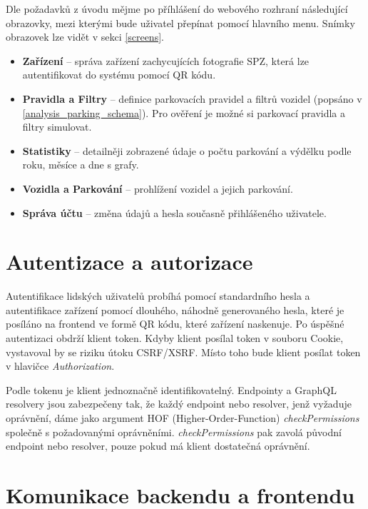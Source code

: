\noindent
Dle požadavků z úvodu mějme po příhlášení do webového rozhraní následující obrazovky,
mezi kterými bude uživatel přepínat pomocí hlavního menu.
Snímky obrazovek lze vidět v sekci \ref{screens}.

\begin{itemize}
  \setlength\itemsep{.05em}
  \item \textbf{Zařízení} -- správa zařízení zachycujících fotografie SPZ, která lze autentifikovat do systému pomocí
        QR kódu.
  \item \textbf{Pravidla a Filtry} -- definice parkovacích pravidel a filtrů vozidel (popsáno v \ref{analysis_parking_schema}).
        Pro ověření je možné si parkovací pravidla a filtry simulovat.
  \item \textbf{Statistiky} -- detailněji zobrazené údaje o počtu parkování a výdělku podle roku, měsíce a dne s grafy.
  \item \textbf{Vozidla a Parkování} -- prohlížení vozidel a jejich parkování.
  \item \textbf{Správa účtu} -- změna údajů a hesla současně přihlášeného uživatele.
\end{itemize}

\section{Autentizace a autorizace} \label{auther_authen}

\noindent
Autentifikace lidských uživatelů probíhá pomocí standardního hesla a autentifikace zařízení pomocí dlouhého,
náhodně generovaného hesla,
které je posíláno na frontend ve formě QR kódu, které zařízení naskenuje.
Po úspěšné autentizaci obdrží klient token.
Kdyby klient posílal token v souboru Cookie, vystavoval by se riziku útoku CSRF/XSRF.
Místo toho bude klient posílat token v hlavičce \textit{Authorization}.

Podle tokenu je klient jednoznačně identifikovatelný. Endpointy a GraphQL resolvery jsou zabezpečeny tak,
že každý endpoint nebo resolver, jenž vyžaduje oprávnění, dáme jako argument HOF (Higher-Order-Function)
\textit{checkPermissions} společně s požadovanými oprávněními. \textit{checkPermissions} pak zavolá původní
endpoint nebo resolver, pouze pokud má klient dostatečná oprávnění.

\section{Komunikace backendu a frontendu}

